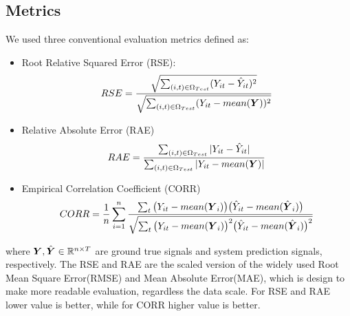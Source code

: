 \subsection{Metrics}
\label{sec:metrics} 
We used three conventional evaluation metrics defined as:
\begin{itemize}
	\item Root Relative Squared Error (RSE):
        \begin{equation}
        \begin{aligned}
        RSE = \frac{\sqrt{\sum_{(i,t) \in \Omega_{Test}}(Y_{it} - \hat{Y}_{it})^2}}
        			{\sqrt{\sum_{(i,t) \in \Omega_{Test}} (Y_{it} - mean({\boldsymbol Y}))^2}}
        \end{aligned}
        \label{eq:RSE}
        \end{equation}
	\item Relative Absolute Error (RAE) 
        \begin{equation}
        RAE = \frac{\sum_{(i,t) \in \Omega_{Test}} |Y_{it} - \hat{Y}_{it}|}
        			{\sum_{(i,t) \in \Omega_{Test}} |Y_{it} - mean({\boldsymbol Y})|}
        \label{eq:RAE}
        \end{equation}   
    \item Empirical Correlation Coefficient (CORR)
        \begin{equation}
        CORR =\frac{1}{n} \sum_{i=1}^n \frac{\sum_t \big(Y_{it} - mean({{\boldsymbol Y}}_i)\big) \big(\hat{Y}_{it} - mean(\hat{{\boldsymbol Y}}_i)\big)}
        	{\sqrt{\sum_t \big(Y_{it} - mean({{\boldsymbol Y}}_i)\big)^2 \big(\hat{Y}_{it} - mean(\hat{{\boldsymbol Y}}_i)\big)^2}}
        \label{eq:Correlation}
        \end{equation}    
\end{itemize}
where ${\boldsymbol Y},\hat{{\boldsymbol Y}} \in \mathbb{R}^{n\times T}$ are ground true signals and system prediction signals, respectively. 
The RSE and RAE are the scaled version of the widely used Root Mean Square Error(RMSE) and Mean Absolute Error(MAE), which is design to make more readable evaluation, regardless the data scale. 
For RSE and RAE lower value is better, while for CORR higher value is better.

